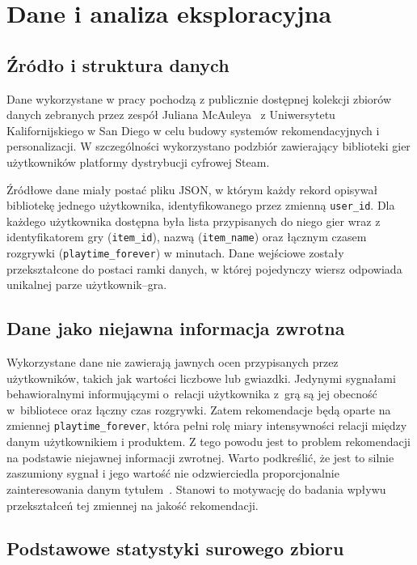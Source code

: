 \chapter{Dane i analiza eksploracyjna}
\label{chap:eda}

\section{Źródło i struktura danych}

Dane wykorzystane w pracy pochodzą z publicznie dostępnej kolekcji zbiorów danych zebranych przez zespół Juliana McAuleya~\cite{mcauleySteamData} z Uniwersytetu Kalifornijskiego w San Diego w celu budowy systemów rekomendacyjnych i personalizacji. W szczególności wykorzystano podzbiór zawierający biblioteki gier użytkowników platformy dystrybucji cyfrowej Steam.

Źródłowe dane miały postać pliku JSON, w którym każdy rekord opisywał bibliotekę jednego użytkownika, identyfikowanego przez zmienną \texttt{user\_id}. Dla każdego użytkownika dostępna była lista przypisanych do niego gier wraz z identyfikatorem gry (\texttt{item\_id}), nazwą (\texttt{item\_name}) oraz łącznym czasem rozgrywki (\texttt{playtime\_forever}) w minutach. Dane wejściowe zostały przekształcone do postaci ramki danych, w której pojedynczy wiersz odpowiada unikalnej parze użytkownik--gra.

\section{Dane jako niejawna informacja zwrotna}

Wykorzystane dane nie zawierają jawnych ocen przypisanych przez użytkowników, takich jak wartości liczbowe lub gwiazdki. Jedynymi sygnałami behawioralnymi informującymi o~relacji użytkownika z~grą są jej obecność w~bibliotece oraz łączny czas rozgrywki. Zatem rekomendacje będą oparte na zmiennej \texttt{playtime\_forever}, która pełni rolę miary intensywności relacji między danym użytkownikiem i produktem. Z tego powodu jest to problem rekomendacji na podstawie niejawnej informacji zwrotnej. Warto podkreślić, że jest to silnie zaszumiony sygnał i jego wartość nie odzwierciedla proporcjonalnie zainteresowania danym tytułem~\cite{hu2008implicit}. Stanowi to motywację do badania wpływu przekształceń tej zmiennej na jakość rekomendacji.

\section{Podstawowe statystyki surowego zbioru}

